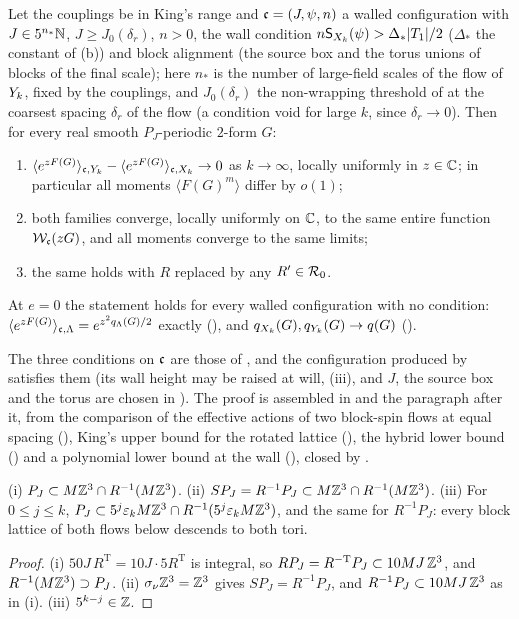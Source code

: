 \begin{theorem}\label{rot:thm:CT}
Let the couplings be in King's range and $\mathfrak c=(J,\psi,n)$ a walled configuration with $J\in5^{n_*}\mathbb N$, $J\ge J_0(\delta_r)$, $n>0$, the wall condition $n\mathsf S_{X_k}(\psi)>\Delta_*|T_1|/2$ ($\Delta_*$ the constant of (b)) and block alignment (the source box and the torus unions of blocks of the final scale); here $n_*$ is the number of large-field scales of the flow of $Y_k$, fixed by the couplings, and $J_0(\delta_r)$ the non-wrapping threshold of  at the coarsest spacing $\delta_r$ of the flow (a condition void for large $k$, since $\delta_r\to0$). Then for every real smooth $P_J$-periodic $2$-form $G$:
\begin{enumerate}[label=\textup{(\roman*)},leftmargin=*]
\item $\langle e^{zF(G)}\rangle_{\mathfrak c,Y_k}-\langle e^{zF(G)}\rangle_{\mathfrak c,X_k}\to0$ as $k\to\infty$, locally uniformly in $z\in\mathbb C$; in particular all moments $\langle F(G)^m\rangle$ differ by $o(1)$;
\item both families converge, locally uniformly on $\mathbb C$, to the same entire function $\mathcal W_{\mathfrak c}(zG)$, and all moments converge to the same limits;
\item the same holds with $R$ replaced by any $R'\in\mathcal R_0$.
\end{enumerate}
At $e=0$ the statement holds for every walled configuration with no condition: $\langle e^{zF(G)}\rangle_{\mathfrak c,\Lambda}=e^{z^2q_\Lambda(G)/2}$ exactly (), and $q_{X_k}(G),q_{Y_k}(G)\to q(G)$ ().
\end{theorem}

The three conditions on $\mathfrak c$ are those of , and the configuration produced by  satisfies them (its wall height may be raised at will, (iii), and $J$, the source box and the torus are chosen in ). The proof is assembled in  and the paragraph after it, from the comparison of the effective actions of two block-spin flows at equal spacing (), King's upper bound for the rotated lattice (), the hybrid lower bound () and a polynomial lower bound at the wall (), closed by .

\begin{lemma}[admissibility]\label{rot:lem:adm}
\textup{(i)} $P_J\subset M\mathbb Z^3\cap R^{-1}(M\mathbb Z^3)$. \textup{(ii)} $SP_J=R^{-1}P_J\subset M\mathbb Z^3\cap R^{-1}(M\mathbb Z^3)$. \textup{(iii)} For $0\le j\le k$, $P_J\subset5^j\varepsilon_kM\mathbb Z^3\cap R^{-1}(5^j\varepsilon_kM\mathbb Z^3)$, and the same for $R^{-1}P_J$: every block lattice of both flows below descends to both tori.
\end{lemma}
\begin{proof}
(i) $50J\,R^{\mathrm T}=10J\cdot5R^{\mathrm T}$ is integral, so $RP_J=R^{-\mathrm T}P_J\subset10MJ\,\mathbb Z^3$, and $R^{-1}(M\mathbb Z^3)\supset P_J$. (ii) $\sigma_\nu\mathbb Z^3=\mathbb Z^3$ gives $SP_J=R^{-1}P_J$, and $R^{-1}P_J\subset10MJ\,\mathbb Z^3$ as in (i). (iii) $5^{k-j}\in\mathbb Z$.
\end{proof}

